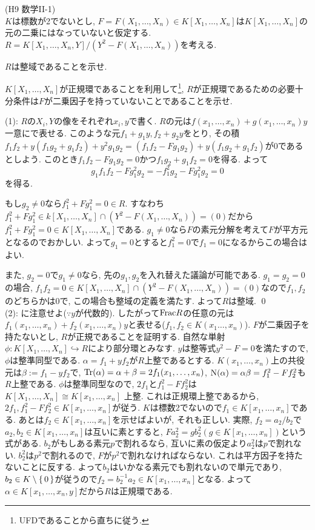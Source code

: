 \begin{egprob} (H9 数学II-1)\\
$K$は標数が2でないとし, $F=F(X_1,\dots, X_n)\in K[X_1,\dots, X_n]$は$K[X_1,\dots, X_n]$の元の二乗にはなっていないと仮定する. $R=K[X_1,\dots, X_n, Y]/(Y^2 - F(X_1,\dots, X_n))$を考える.
\ben
\item $R$は整域であることを示せ.
\item $K[X_1,\dots, X_n]$が正規環であることを利用して\footnote{UFDであることから直ちに従う.}, $R$が正規環であるための必要十分条件は$F$が二乗因子を持っていないことであることを示せ.
\een
\end{egprob}

\begin{egans}
(1): $R$の$X_i,Y$の像をそれぞれ$x_i,y$で書く. $R$の元は$f(x_1,\dots, x_n) + g(x_1,\dots, x_n)y$一意にで表せる. このような元$f_1 + g_1y, f_2+g_2y$をとり, その積$f_1f_2 + y(f_1g_2 + g_1f_2) + y^2g_1g_2 = (f_1f_2 - Fg_1g_2) + y(f_1g_2 + g_1f_2) $が0であるとしよう. このとき$f_1f_2 - Fg_1g_2 = 0$かつ$f_1g_2 + g_1f_2 = 0$を得る. よって
\[g_1f_1f_2 - Fg_1^2g_2 = -f_1^2g_2 - Fg_1^2g_2 = 0\]
を得る. \par
もし$g_2\neq 0$なら$f_1^2 + Fg_1^2 = 0\in R$. すなわち$f_1^2 + Fg_1^2 \in k[X_1,\dots, X_n]\cap (Y^2-F(X_1,\dots,X_n)) = (0)$だから$f_1^2 + Fg_1^2 = 0 \in K[X_1,\dots, X_n]$である. $g_1\neq 0$なら$F$の素元分解を考えて$F$が平方元となるのでおかしい. よって$g_1=0$とすると$f_1^2=0$で$f_1=0$になるからこの場合はよい. \par
また, $g_2 = 0$で$g_1\neq 0$なら, 先の$g_1,g_2$を入れ替えた議論が可能である. $g_1=g_2=0$の場合, $f_1f_2 = 0 \in K[X_1,\dots, X_n]\cap (Y^2-F(X_1,\dots, X_n)) = (0)$なので$f_1,f_2$のどちらかは0で, この場合も整域の定義を満たす. よって$R$は整域. \qed \\
(2): に注意せよ($\because y$が代数的). したがって$\mathrm{Frac}R$の任意の元は$ f_1(x_1,\dots, x_n) + f_2(x_1,\dots, x_n)y$と表せる($f_1,f_2\in K(x_1\dots, x_n)$).
$F$が二乗因子を持たないとし, $R$が正規であることを証明する. 自然な単射 $\phi:K[X_1,\dots,X_n]\hookrightarrow R$により部分環とみなす. $y$は整等式$y^2 - F = 0$を満たすので, $\phi$は整準同型である.   $\alpha=f_1 + yf_2$が$R$上整であるとする. $K(x_1,\dots, x_n)$上の共役元は$\beta := f_1 - yf_2$で, $\mathrm{Tr}(\alpha) = \alpha + \beta = 2f_1(x_1,\dots, x_n)$, $\mathrm{N}(\alpha) = \alpha\beta = f_1^2 - Ff_2^2$も$R$上整である. $\phi$は整準同型なので, $2f_1$と$f_1^2 - Ff_2^2$は$K[X_1,\dots, X_n] \cong K[x_1,\dots, x_n]$ 上整. これは正規環上整であるから, $2f_1, f_1^2 - Ff_2^2 \in K[x_1,\dots, x_n]$が従う. $K$は標数2でないので$f_1\in K[x_1,\dots, x_n]$である. あとは$f_2\in K[x_1,\dots, x_n]$を示せばよいが, それも正しい. 実際, $f_2 = a_2/b_2$で$a_2,b_2\in K[x_1,\dots, x_n]$は互いに素とすると, $Fa_2^2 = gb_2^2 (g\in K[x_1,\dots,x_n])$という式がある. $b_2$がもしある素元$p$で割れるなら, 互いに素の仮定より$a_2^2$は$p$で割れない. $b_2^2$は$p^2$で割れるので, $F$が$p^2$で割れなければならない.  これは平方因子を持たないことに反する. よって$b_2$はいかなる素元でも割れないので単元であり, $b_2\in K\setminus{\set{0}}$が従うので$f_2 = b_2^{-1}a_2 \in K[x_1,\dots, x_n]$となる. よって$\alpha \in K[x_1,\dots, x_n,y]$だから$R$は正規環である. \par

\end{egans}
